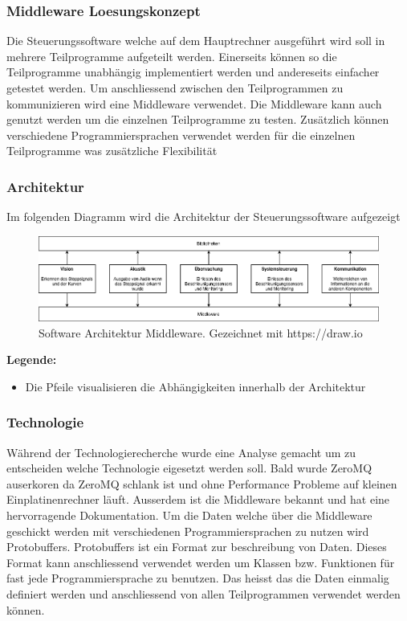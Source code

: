 \documentclass[../../main.tex]{subfiles}
\begin{document}
\subsubsection{Middleware Loesungskonzept}
Die Steuerungssoftware welche auf dem Hauptrechner ausgeführt wird soll in mehrere Teilprogramme aufgeteilt werden.
Einerseits können so die Teilprogramme unabhängig implementiert werden und andereseits einfacher getestet werden.
Um anschliessend zwischen den Teilprogrammen zu kommunizieren wird eine Middleware verwendet. Die Middleware kann auch genutzt werden
um die einzelnen Teilprogramme zu testen. Zusätzlich können verschiedene Programmiersprachen verwendet werden für die einzelnen Teilprogramme
was zusätzliche Flexibilität

\subsubsection{Architektur}
Im folgenden Diagramm wird die Architektur der Steuerungssoftware aufgezeigt
\begin{figure}[H] %
    \centering
    \includegraphics[width=1.0\textwidth]{../../drawings/ArchitekturDiagramm/SW_Architektur_Middleware.png}
    \caption {Software Architektur Middleware. Gezeichnet mit https://draw.io}
\end{figure}

\textbf{Legende:}
\begin{itemize}
    \item Die Pfeile visualisieren die Abhängigkeiten innerhalb der Architektur
\end{itemize}

\subsubsection{Technologie}
Während der Technologierecherche wurde eine Analyse gemacht um zu entscheiden welche Technologie eigesetzt werden soll. Bald wurde ZeroMQ
auserkoren da ZeroMQ schlank ist und ohne Performance Probleme auf kleinen Einplatinenrechner läuft. Ausserdem ist die Middleware bekannt
und hat eine hervorragende Dokumentation. Um die Daten welche über die Middleware geschickt werden mit verschiedenen Programmiersprachen zu
nutzen wird Protobuffers. Protobuffers ist ein Format zur beschreibung von Daten. Dieses Format kann anschliessend verwendet werden um
Klassen bzw. Funktionen für fast jede Programmiersprache zu benutzen. Das heisst das die Daten einmalig definiert werden und anschliessend von
allen Teilprogrammen verwendet werden können.
\end{document}
